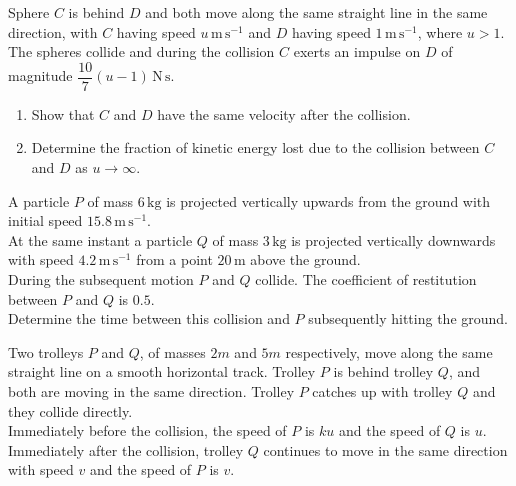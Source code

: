 \documentclass[leqno]{article}
\begin{document}
\begin{enumerate}[
  label=\textbf{\arabic*.},
  leftmargin=*,
  topsep=0pt,
  partopsep=0pt,
  parsep=0pt
]
Sphere $C$ is behind $D$ and both move along the same straight line in the same direction, with $C$ having speed $u\,\mathrm{m}\,\mathrm{s}^{-1}$ and $D$ having speed $1\,\mathrm{m}\,\mathrm{s}^{-1}$, where $u>1$.  \\

The spheres collide and during the collision $C$ exerts an impulse on $D$ of magnitude $\dfrac{10}{7}(u-1)\,\mathrm{N}\,\mathrm{s}$. \\
\begin{enumerate}[label=\textbf{(\alph*)}, resume]
  \item Show that $C$ and $D$ have the same velocity after the collision.  \\
  \item Determine the fraction of kinetic energy lost due to the collision between $C$ and $D$ as $u \to \infty$.  \\
\end{enumerate}

\newpage

\questionitem

A particle $P$ of mass $6\,\mathrm{kg}$ is projected vertically upwards from the ground with initial speed $15.8\,\mathrm{m\,s}^{-1}$. \\

At the same instant a particle $Q$ of mass $3\,\mathrm{kg}$ is projected vertically downwards with speed $4.2\,\mathrm{m\,s}^{-1}$ from a point $20\,\mathrm{m}$ above the ground. \\

During the subsequent motion $P$ and $Q$ collide. The coefficient of restitution between $P$ and $Q$ is $0.5$. \\

Determine the time between this collision and $P$ subsequently hitting the ground. 

\newpage

\questionitem

Two trolleys $P$ and $Q$, of masses $2m$ and $5m$ respectively, move along the same straight line on a smooth horizontal track. Trolley $P$ is behind trolley $Q$, and both are moving in the same direction. Trolley $P$ catches up with trolley $Q$ and they collide directly. \\

Immediately before the collision, the speed of $P$ is $ku$ and the speed of $Q$ is $u$. \\
Immediately after the collision, trolley $Q$ continues to move in the same direction with speed $v$ and the speed of $P$ is $v$. \\


\end{enumerate}
\end{document}
